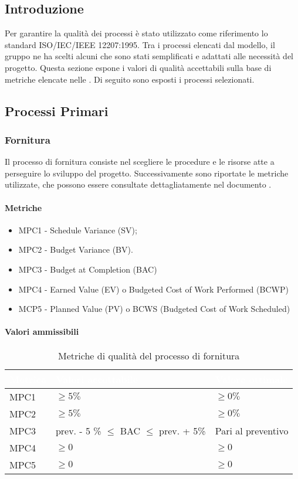 
\subsection{Introduzione}
Per garantire la qualità dei processi è stato utilizzato come riferimento lo standard ISO/IEC/IEEE 12207:1995. Tra i processi elencati dal modello, il gruppo ne ha scelti alcuni che sono stati semplificati e adattati alle necessità del progetto. Questa sezione espone i valori di qualità accettabili sulla base di metriche elencate nelle . Di seguito sono esposti i processi selezionati.

\subsection{Processi Primari}

\subsubsection{Fornitura}
Il processo di fornitura consiste nel scegliere le procedure e le risorse atte a perseguire lo sviluppo del progetto. Successivamente sono riportate le metriche utilizzate, che possono essere consultate dettagliatamente nel documento .

\paragraph{Metriche}
\begin{itemize}
	\item MPC1 - Schedule Variance (SV);
	\item MPC2 - Budget Variance (BV).
	\item MPC3 - Budget at Completion (BAC)
	\item MPC4 - Earned Value (EV) o Budgeted Cost of Work Performed (BCWP)
	\item MCP5 - Planned Value (PV) o BCWS (Budgeted Cost of Work Scheduled)
\end{itemize}

\paragraph{Valori ammissibili}
{
\renewcommand{\arraystretch}{1.5}
\centering
\begin{longtable}{C{2.5cm} C{7cm} C{4cm}}
\textcolor{white}{\textbf{Metrica}}&
\textcolor{white}{\textbf{Valori accettabile}}&
\textcolor{white}{\textbf{Valore ottimale}}\\	
\endhead
\endfoot
{}\caption{Metriche di qualità del processo di fornitura}
\endlastfoot

MPC1 & $\geq 5\%$ & $\geq 0\%$ \\
MPC2 & $\geq 5\%$ & $\geq 0\%$ \\
MPC3 & prev. - 5 \% $ \leq $ BAC $ \leq $ prev. + 5\% & Pari al preventivo  \\
MPC4 & $\geq 0$  & $\geq 0$ \\
MPC5 & $\geq 0$  & $\geq 0$ \\
\end{longtable}
}



